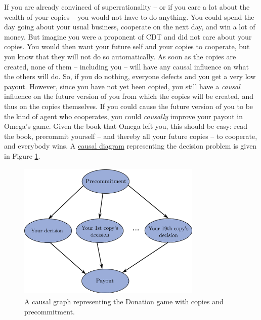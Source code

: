 If you are already convinced of superrationality -- or if you care a lot
about the wealth of your copies -- you would not have to do anything.
You could spend the day going about your usual business, cooperate on
the next day, and win a lot of money. But imagine you were a proponent
of CDT and did not care about your copies. You would then want your
future self and your copies to cooperate, but you know that they will
not do so automatically. As soon as the copies are created, none of them
-- including you -- will have any causal influence on what the others
will do. So, if you do nothing, everyone defects and you get a very low
payout. However, since you have not yet been copied, you still have a
\emph{causal} influence on the future version of you from which the
copies will be created, and thus on the copies themselves. If you could
cause the future version of you to be the kind of agent who cooperates,
you could \emph{causally} improve your payout in Omega's game. Given the
book that Omega left you, this should be easy: read the book, precommit
yourself -- and thereby all your future copies -- to cooperate, and
everybody wins. A
\href{https://en.wikipedia.org/wiki/Causal_model\#Causal_diagram}{causal
diagram} representing the decision problem is given in Figure
\ref{precommitment-causal-graph}.

\begin{figure}[t!]
    \centering
    \includegraphics[width=3.46217in,height=2.59375in]{figs/precommitment-causal-graph}
    \caption{A causal graph representing the Donation game with copies and precommitment.}
    \label{precommitment-causal-graph}
\end{figure}



